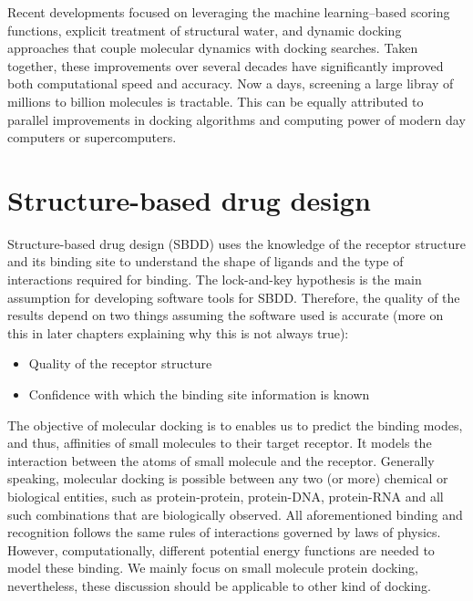 \documentclass[12pt, a4paper]{article}
\begin{document}
Recent developments focused on leveraging the machine learning–based scoring functions, explicit treatment of structural water, and dynamic docking approaches that couple molecular dynamics with docking searches\cite{CH1_10}. Taken together, these improvements over several decades have significantly improved both computational speed and accuracy. Now a days, screening a large libray of millions to billion molecules is tractable. This can be equally attributed to parallel improvements in docking algorithms and computing power of modern day computers or supercomputers.

\section{Structure-based drug design}
Structure-based drug design (SBDD) uses the knowledge of the receptor structure and its binding site  to understand the shape of ligands and the type of interactions required for binding. The lock-and-key hypothesis is the main assumption for developing software tools for SBDD. Therefore, the quality of the results depend on two things assuming the software used is accurate (more on this in later chapters explaining why this is not always true):
\begin{itemize}
    \item Quality of the receptor structure
    \item Confidence with which the binding site information is known
\end{itemize}
The objective of molecular docking is to enables us to predict the binding modes, and thus, affinities of small molecules to their target receptor. It models the interaction between the atoms of small molecule and the receptor. Generally speaking, molecular docking is possible between any two (or more) chemical or biological entities, such as protein-protein, protein-DNA, protein-RNA and all such combinations that are biologically observed. All aforementioned binding and recognition follows the same rules of interactions governed by laws of physics. However, computationally, different potential energy functions are needed to model these binding. We  mainly focus on small molecule protein docking, nevertheless, these discussion should be applicable to other kind of docking. 
\end{document}
